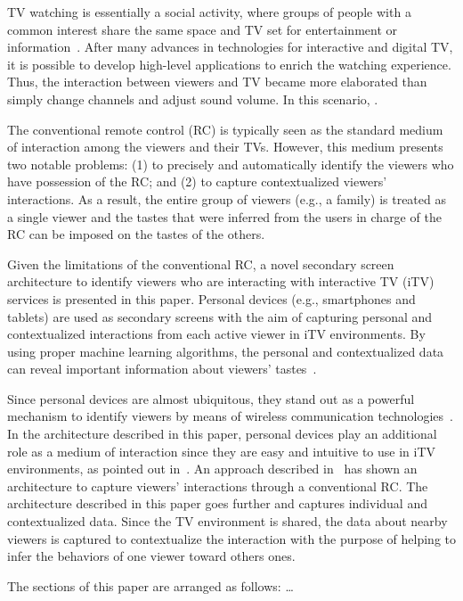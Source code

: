 \documentclass[journal]{IEEEtran}
\begin{document}
TV watching is essentially a social activity, where groups of people with a common interest share the same space and TV set for entertainment or information~\cite{Masthoff2004}. After many advances in technologies for interactive and digital TV, it is possible to develop high-level applications to enrich the watching experience. Thus, the interaction between viewers and TV became more elaborated than simply change channels and adjust sound volume. In this scenario, .

The conventional remote control (RC) is typically seen as the standard medium of interaction among the viewers and their TVs. However, this medium presents two notable problems: (1) to precisely and automatically identify the viewers who have possession of the RC; and (2) to capture contextualized viewers' interactions. As a result, the entire group of viewers (e.g., a family) is treated as a single viewer and the tastes that were inferred from the users in charge of the RC can be imposed on the tastes of the others.

Given the limitations of the conventional RC, a novel secondary screen architecture to identify viewers who are interacting with interactive TV (iTV) services is presented in this paper. Personal devices (e.g., smartphones and tablets) are used as secondary screens with the aim of capturing personal and contextualized interactions from each active viewer in iTV environments. By using proper machine learning algorithms, the personal and contextualized data can reveal important information about viewers' tastes~\cite{Kim2012,Shin2009}. 

Since personal devices are almost ubiquitous, they stand out as a powerful mechanism to identify viewers by means of wireless communication technologies~\cite{Cabarcos2011}. In the architecture described in this paper, personal devices play an additional role as a medium of interaction since they are easy and intuitive to use in iTV environments, as pointed out in~\cite{Courtois2012}. An approach described in~\cite{Teixeira2010} has shown an architecture to capture viewers' interactions through a conventional RC. The architecture described in this paper goes further and captures individual and contextualized data. Since the TV environment is shared, the data about nearby viewers is captured to contextualize the interaction with the purpose of helping to infer the behaviors of one viewer toward others ones.

The sections of this paper are arranged as follows: \ldots
\end{document}
